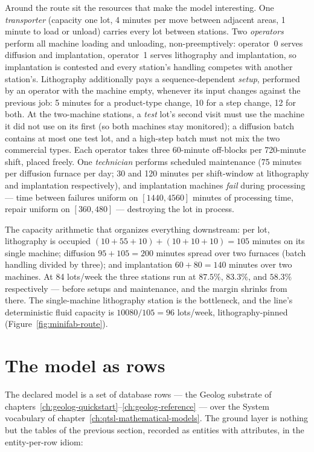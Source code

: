 Around the route sit the resources that make the model interesting.
One \emph{transporter} (capacity one lot, 4 minutes per move between
adjacent areas, 1 minute to load or unload) carries every lot between
stations. Two \emph{operators} perform all machine loading and
unloading, non-preemptively: operator~0 serves diffusion and
implantation, operator~1 serves lithography and implantation, so
implantation is contested and every station's handling competes with
another station's. Lithography additionally pays a sequence-dependent
\emph{setup}, performed by an operator with the machine empty,
whenever its input changes against the previous job: 5 minutes for a
product-type change, 10 for a step change, 12 for both. At the
two-machine stations, a \emph{test} lot's second visit must use the
machine it did not use on its first (so both machines stay
monitored); a diffusion batch contains at most one test lot, and a
high-step batch must not mix the two commercial types. Each operator
takes three 60-minute off-blocks per 720-minute shift, placed freely.
One \emph{technician} performs scheduled maintenance (75 minutes per
diffusion furnace per day; 30 and 120 minutes per shift-window at
lithography and implantation respectively), and implantation machines
\emph{fail} during processing --- time between failures uniform on
$[1440, 4560]$ minutes of processing time, repair uniform on $[360,
480]$ --- destroying the lot in process.

The capacity arithmetic that organizes everything downstream: per
lot, lithography is occupied $(10 + 55 + 10) + (10 + 10 + 10) = 105$
minutes on its single machine; diffusion $95 + 105 = 200$ minutes
spread over two furnaces (batch handling divided by three); and
implantation $60 + 80 = 140$ minutes over two machines. At 84
lots/week the three stations run at $87.5\%$, $83.3\%$, and $58.3\%$
respectively --- before setups and maintenance, and the margin
shrinks from there. The single-machine lithography station is the
bottleneck, and the line's deterministic fluid capacity is
$10080/105 = 96$ lots/week, lithography-pinned
(Figure~\ref{fig:minifab-route}).

\section{The model as rows}
\label{sec:minifab-rows}

The declared model is a set of database rows --- the Geolog substrate
of chapters~\ref{ch:geolog-quickstart}--\ref{ch:geolog-reference} ---
over the System vocabulary of chapter~\ref{ch:qtsl-mathematical-models}. The
ground layer is nothing but the tables of the previous section,
recorded as entities with attributes, in the entity-per-row idiom:


